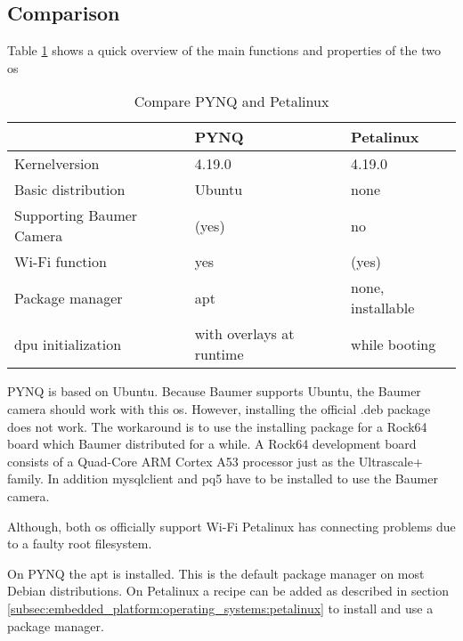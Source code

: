 \subsection{Comparison}
\label{subsec:embedded_platform:operating_systems:comparison}
Table \ref{tab:compare_os} shows a quick overview of the main functions and properties of the two \acrlong{os}

\begin{table}[hb]
  \caption{Compare PYNQ and Petalinux}
  \label{tab:compare_os}
  \centering
  \begin{tabular}{lll}
    \toprule
    \textbf{} & \textbf{PYNQ} & \textbf{Petalinux} \\
    \midrule
    Kernelversion & 4.19.0 & 4.19.0 \\
    Basic distribution & Ubuntu \cite{pynq_presentation} & none \\
    Supporting Baumer Camera & (yes) \cite{baumer_prog_guide} & no \\
    Wi-Fi function & yes & (yes) \\
    Package manager & \acrshort{apt} & none, installable \\
    \acrshort{dpu} initialization & with overlays at runtime \cite{pynq_overlays} & while booting \cite{petalinux_user_guide} \\
    \bottomrule
  \end{tabular}
\end{table}

PYNQ is based on Ubuntu.
Because Baumer supports Ubuntu, the Baumer camera should work with this \acrlong{os}.
However, installing the official .deb package does not work.
The workaround is to use the installing package for a Rock64 board which Baumer distributed for a while.
A Rock64 development board consists of a Quad-Core ARM Cortex A53 processor just as the Ultrascale+ family.
In addition mysqlclient and pq5 have to be installed to use the Baumer camera.

Although, both \acrshort{os} officially support Wi-Fi Petalinux has connecting problems due to a faulty root filesystem.

On PYNQ the \acrfull{apt} is installed.
This is the default package manager on most Debian distributions.
On Petalinux a recipe can be added as described in section \ref{subsec:embedded_platform:operating_systems:petalinux} to install and use a package manager.

